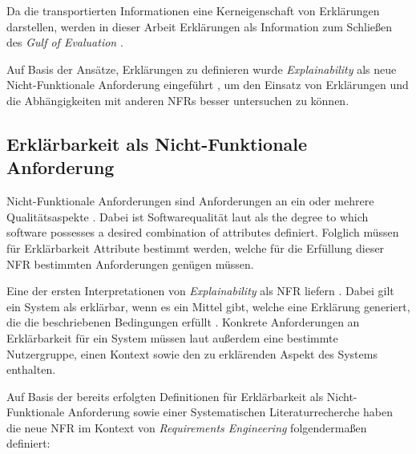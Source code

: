 Da die transportierten Informationen eine Kerneigenschaft von Erklärungen darstellen, werden in dieser Arbeit Erklärungen als Information zum Schließen des \textit{Gulf of Evaluation} \cite{norman1988psychology}.

Auf Basis der Ansätze, Erklärungen zu definieren wurde \textit{Explainability} als neue Nicht-Funktionale Anforderung eingeführt \cite{kohl_explainability_2019}, um den Einsatz von Erklärungen und die Abhängigkeiten mit anderen NFRs besser untersuchen zu können.

\subsection{Erklärbarkeit als Nicht-Funktionale Anforderung}
\label{02_basics:explainability}

Nicht-Funktionale Anforderungen sind Anforderungen an ein oder mehrere Qualitätsaspekte \cite{chung2009non,schneider2012abenteuer}. Dabei ist Softwarequalität laut  als \glqq [...] the degree to which software possesses a desired combination of attributes\grqq{}\cite{international1992ieee} definiert. Folglich müssen für Erklärbarkeit Attribute bestimmt werden, welche für die Erfüllung dieser NFR bestimmten Anforderungen genügen müssen.

Eine der ersten Interpretationen von \textit{Explainability} als NFR liefern \citeauthor{kohl_explainability_2019}. Dabei gilt ein System als erklärbar, wenn es ein Mittel gibt, welche eine Erklärung generiert, die die beschriebenen Bedingungen erfüllt \cite{kohl_explainability_2019}. Konkrete Anforderungen an Erklärbarkeit für ein System müssen laut \citeauthor{kohl_explainability_2019} außerdem eine bestimmte Nutzergruppe, einen Kontext sowie den zu erklärenden Aspekt des Systems enthalten.

Auf Basis der bereits erfolgten Definitionen für Erklärbarkeit als Nicht-Funktionale Anforderung sowie einer Systematischen Literaturrecherche haben \citeauthor{chazette_knowledge_nodate} die neue NFR im Kontext von \textit{Requirements Engineering} folgendermaßen definiert:

\smallskip

\noindent{}

